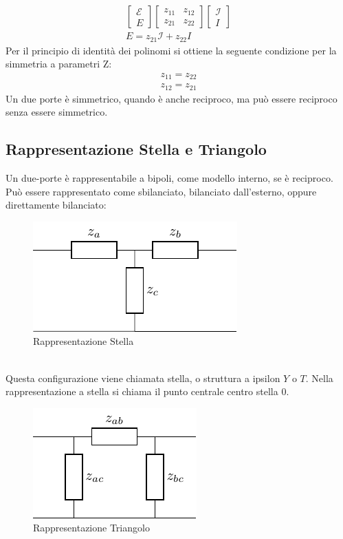 \documentclass{article}
\numberwithin{equation}{subsection}
\begin{document}
\begin{gather*}
    \begin{bmatrix}
        \mathcal{E}\\E
    \end{bmatrix}\begin{bmatrix}
        z_{11}&z_{12}\\z_{21}&z_{22}
    \end{bmatrix}\begin{bmatrix}
        \mathcal{I}\\I
    \end{bmatrix}\\
    E=z_{21}\mathcal{I}+z_{22}I
\end{gather*}
Per il principio di identità dei polinomi si ottiene la seguente condizione per la simmetria a parametri Z:
\begin{gather*}
    z_{11}=z_{22}\\
    z_{12}=z_{21}
\end{gather*}
Un due porte è simmetrico, quando è anche reciproco, ma può essere reciproco senza essere simmetrico. 

\subsection{Rappresentazione Stella e Triangolo}

Un due-porte è rappresentabile a bipoli, come modello interno, se è reciproco. Può essere rappresentato come sbilanciato, bilanciato dall'esterno, oppure direttamente 
bilanciato:
\begin{figure}[ht]%
    \centering
    \includegraphics{rappresentazione-stella.pdf}
    \caption{Rappresentazione Stella}
    \label{fig:rappresentazione-stella}
\end{figure}
\\
Questa configurazione viene chiamata stella, o struttura a ipsilon $Y$ o $T$.  
Nella rappresentazione a stella si chiama il punto centrale centro stella $0$. 

\begin{figure}[ht]%
    \centering
    \includegraphics{rappresentazione-triangolo.pdf}
    \caption{Rappresentazione Triangolo}
    \label{fig:rappresentazione-triangolo}
\end{figure}
\end{document}
